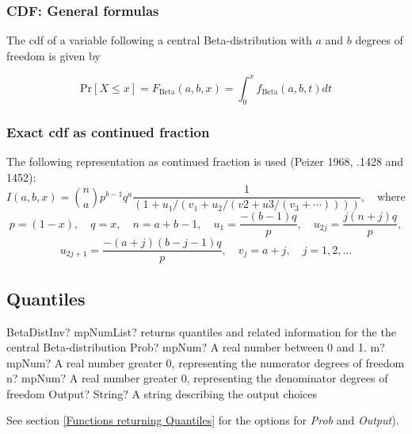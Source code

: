 \subsubsection{CDF: General formulas}
\label{BetaDistributionCDF}
The cdf of a variable following a central  Beta-distribution with $a$ and $b$ degrees of freedom is given by

\begin{equation}
	\text{Pr}\left[X \le x\right] = F_{\text{Beta}}\left(a,b,x\right) =  \int_{0}^{x} f_{\text{Beta}}(a,b,t) dt
\end{equation}

\subsubsection{Exact cdf as continued fraction}
The following representation as continued fraction is used (Peizer 1968, .1428 and 1452):
\begin{equation}
	I(a,b,x)= \binom{n}{a} p^{b-1} q^a \frac{1}{(1+u_1/(v_1+u_2/(v2+u3/(v_3+ \cdots))))}, \quad \text{where } 
\end{equation}
\begin{equation*}
	p=(1-x), \quad q=x, \quad n=a+b-1, \quad u_1= \frac{-(b-1)q}{p}, \quad u_{2j}= \frac{j(n+j)q}{p},
\end{equation*}
\begin{equation*}
	u_{2j+1}= \frac{-(a+j)(b-j-1)q}{p}, \quad v_j=a+j, \quad j=1,2,\ldots
\end{equation*}


\subsection{Quantiles}

\begin{mpFunctionsExtract}
	\mpFunctionFour
	{BetaDistInv? mpNumList? returns quantiles and related information for the the central Beta-distribution}
	{Prob? mpNum? A real number between 0 and 1.}
	{m? mpNum? A real number greater 0, representing the numerator  degrees of freedom}
	{n? mpNum? A real number greater 0, representing the denominator degrees of freedom}
	{Output? String? A string describing the output choices}
\end{mpFunctionsExtract}

See section \ref{Functions returning Quantiles} for the options for  {\itshape\sffamily Prob} and {\itshape\sffamily Output}). 

